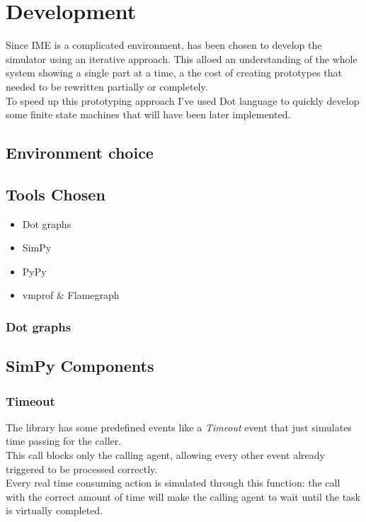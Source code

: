 
\section{Development}
Since IME is a complicated environment, has been chosen to develop the simulator 
using an iterative approach. This alloed an understanding of the whole system
showing a single part at a time, a the cost of creating prototypes that needed
to be rewritten partially or completely. \\
To speed up this prototyping approach I've used Dot language \cite{dot-lang} to 
quickly develop some finite state machines that will have been later implemented.

\subsection{Environment choice}

\subsection{Tools Chosen}
\begin{itemize}
    \item Dot graphs
    \item SimPy
    \item PyPy
    \item vmprof \& Flamegraph
\end{itemize}

\subsubsection*{Dot graphs}

\subsection{SimPy Components}
\subsubsection*{Timeout}
The library has some predefined events like a \textit{Timeout} event that just
simulates time passing for the caller.\\
This call blocks only the calling agent, allowing every other event already
triggered to be processed correctly. \\
Every real time consuming action is simulated through this function: the call
with the correct amount of time will make the calling agent to wait until the
task is virtually completed.

